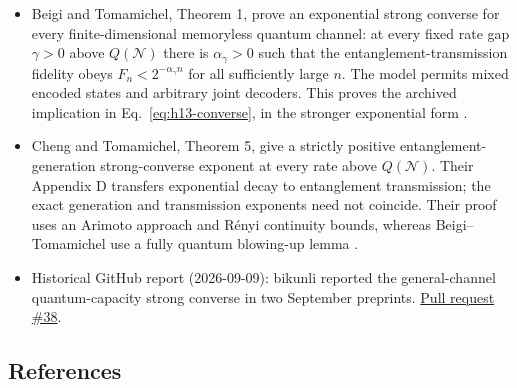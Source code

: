 \begin{itemize}
  \item Beigi and Tomamichel, Theorem 1, prove an exponential strong converse for every finite-dimensional memoryless quantum channel: at every fixed rate gap $\gamma>0$ above $Q(\mathcal N)$ there is $\alpha_\gamma>0$ such that the entanglement-transmission fidelity obeys $F_n<2^{-\alpha_\gamma n}$ for all sufficiently large $n$. The model permits mixed encoded states and arbitrary joint decoders. This proves the archived implication in Eq.~\eqref{eq:h13-converse}, in the stronger exponential form .

  \item Cheng and Tomamichel, Theorem 5, give a strictly positive entanglement-generation strong-converse exponent at every rate above $Q(\mathcal N)$. Their Appendix D transfers exponential decay to entanglement transmission; the exact generation and transmission exponents need not coincide. Their proof uses an Arimoto approach and R\'enyi continuity bounds, whereas Beigi--Tomamichel use a fully quantum blowing-up lemma .

  \item Historical GitHub report (2026-09-09): bikunli reported the general-channel quantum-capacity strong converse in two September preprints. \href{https://github.com/Naixu-Guo/quantum-open-problems/pull/38}{Pull request \#38}.
\end{itemize}

\subsection*{References}


